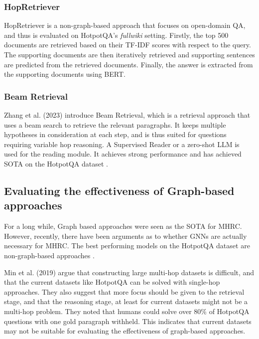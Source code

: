 \documentclass[sigplan,screen,nonacm]{acmart}
\begin{document}
\subsubsection{HopRetriever}
HopRetriever \cite{RN149} is a non-graph-based approach that focuses on open-domain QA, and thus is evaluated on HotpotQA's \emph{fullwiki} 
setting. Firstly, the top 500 documents are retrieved based on their TF-IDF scores with respect to the query. The supporting documents
are then iteratively retrieved and supporting sentences are predicted from the retrieved documents. Finally, the answer is extracted 
from the supporting documents using BERT.

\subsubsection{Beam Retrieval}
 Zhang et al. (2023)\cite{RN105} introduce Beam Retrieval, which is a retrieval approach that uses a beam search to retrieve the relevant 
 paragraphs. It keeps multiple hypotheses in consideration at each step, and is thus suited for questions requiring variable hop reasoning. 
 A Supervised Reader or a zero-shot LLM is used for the reading module. It achieves strong performance and has achieved SOTA on the 
 HotpotQA dataset \cite{RN116}.


\subsection{Evaluating the effectiveness of Graph-based approaches}

For a long while, Graph based approaches were seen as the SOTA for MHRC. However, recently, there have been arguments as to whether GNNs 
are actually necessary for MHRC. The best performing models on the HotpotQA dataset \cite{RN116} are non-graph-based approaches \cite{RN105} 
\cite{RN149}.

Min et al. (2019) \cite{RN150} argue that constructing large multi-hop datasets is difficult, and that the current datasets like HotpotQA can 
be solved with single-hop approaches. They also suggest that more focus should be given to the retrieval stage, and that the reasoning stage, 
at least for current datasets might not be a multi-hop problem. They noted that humans could solve over 80\% of HotpotQA questions with one 
gold paragraph withheld. This indicates that current datasets may not be suitable for evaluating the effectiveness of graph-based approaches.
\end{document}
